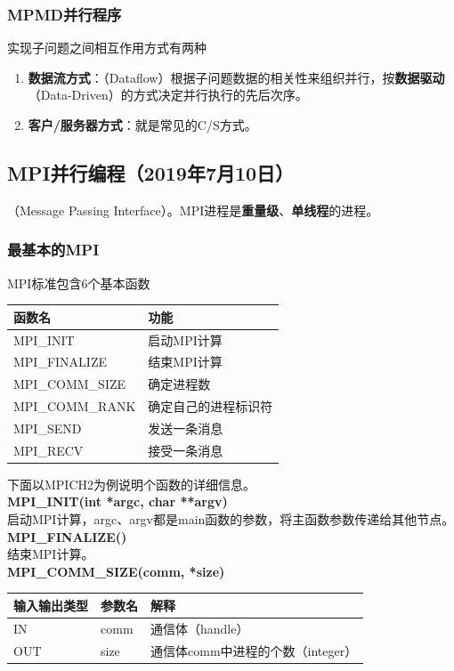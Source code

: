 \documentclass{article}
\begin{document}
				\subsubsection{MPMD并行程序}
					实现子问题之间相互作用方式有两种
					\begin{enumerate}
						\item \textbf{数据流方式}：（Dataflow）根据子问题数据的相关性来组织并行，按\textbf{数据驱动}（Data-Driven）的方式决定并行执行的先后次序。
						\item \textbf{客户/服务器方式}：就是常见的C/S方式。
					\end{enumerate}
			\subsection{MPI并行编程（2019年7月10日）}
				（Message Passing Interface）。MPI进程是\textbf{重量级}、\textbf{单线程}的进程。
				\subsubsection{最基本的MPI}
					MPI标准包含6个基本函数
					\begin{table}[H]
						\centering
						\begin{tabular}{ll}
							\hline
							函数名 & 功能\\
							\hline
							MPI\_INIT & 启动MPI计算\\
							MPI\_FINALIZE & 结束MPI计算\\
							MPI\_COMM\_SIZE & 确定进程数\\
							MPI\_COMM\_RANK & 确定自己的进程标识符\\
							MPI\_SEND & 发送一条消息\\
							MPI\_RECV & 接受一条消息\\
							\hline
						\end{tabular}
					\end{table}
					下面以MPICH2为例说明个函数的详细信息。
					\\\textbf{MPI\_INIT(int *argc, char **argv)}\\
						启动MPI计算，argc、argv都是main函数的参数，将主函数参数传递给其他节点。
					\\\textbf{MPI\_FINALIZE()}\\
						结束MPI计算。
					\\\textbf{MPI\_COMM\_SIZE(comm, *size)}\\
						\begin{table}[H]
							\centering
							\begin{tabular}{lll}
								\hline
								输入输出类型 & 参数名 & 解释\\
								\hline
								IN & comm & 通信体（handle）\\
								OUT & size & 通信体comm中进程的个数（integer）\\
								\hline
							\end{tabular}
						\end{table}
					
\end{document}
